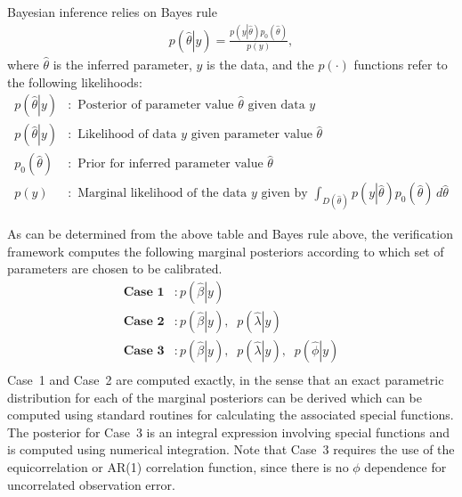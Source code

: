 \documentclass{book}
\begin{document}
\vspace{.1in}
Bayesian inference relies on Bayes rule
\begin{align*}
p\left(\left. \hat \theta \right| y  \right) = \frac{p\left( y \left| \hat \theta \right. \right) p_0\left(\hat \theta\right)} { p\left(y\right)},
\end{align*}
where $\hat \theta$ is the inferred parameter, $y$ is the data, and the $p(\cdot)$ functions refer to
the following likelihoods:
\begin{align*}
p\left(\left. \hat \theta \right| y \right) &: \text{ Posterior of parameter value } \hat \theta \text{ given data } y \\
p\left(\left. \hat \theta \right| y \right) &: \text{ Likelihood of data } y \text{ given parameter value } \hat \theta \\
p_0\left(\hat \theta\right) &: \text{ Prior for inferred parameter value } \hat \theta \\
p\left(y\right) &: \text{ Marginal likelihood of the data } y \text{ given by }
 \int_{D(\hat \theta)} p\left( y \left| \hat \theta \right. \right) p_0\left(\hat \theta\right)\,d\hat\theta
\end{align*}

As can be determined from the above table and Bayes rule above, the verification framework computes the following
marginal posteriors according to which set of parameters are chosen to be calibrated.
\begin{align*}
\textbf{Case 1} &: p\left(\left. \hat \beta \right| y\right)\\
\textbf{Case 2} &: p\left(\left. \hat \beta \right| y\right), \;\; p\left(\left. \hat \lambda \right| y\right) \\
\textbf{Case 3} &: p\left(\left. \hat \beta \right| y\right), \;\; p\left(\left. \hat \lambda \right| y\right), \;\; p\left(\left. \hat \phi \right| y\right) \\
\end{align*}
Case~1 and Case~2 are computed exactly, in the sense that an exact parametric distribution for each of the marginal
posteriors can be derived which can be computed using standard routines for calculating the associated special functions.
The posterior for Case~3 is an integral expression involving special functions and is computed using numerical integration. 
Note that Case~3 requires the use of the equicorrelation or AR(1) correlation function, since there is no $\phi$ dependence
for uncorrelated observation error. 
\end{document}
